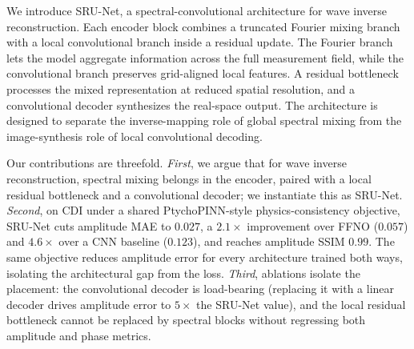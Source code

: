 \documentclass[11pt]{article}
\begin{document}
We introduce SRU-Net, a spectral-convolutional architecture for wave inverse
reconstruction. Each encoder block combines a truncated Fourier mixing branch
with a local convolutional branch inside a residual update. The Fourier branch
lets the model aggregate information across the full measurement field, while
the convolutional branch preserves grid-aligned local features. A residual
bottleneck processes the mixed representation at reduced spatial resolution, and
a convolutional decoder synthesizes the real-space output. The architecture is
designed to separate the inverse-mapping role of global spectral mixing from the
image-synthesis role of local convolutional decoding.

Our contributions are threefold. \emph{First}, we argue that for wave inverse
reconstruction, spectral mixing belongs in the encoder, paired with a local
residual bottleneck and a convolutional decoder; we instantiate this as
SRU-Net. \emph{Second}, on CDI under a shared PtychoPINN-style
physics-consistency objective, SRU-Net cuts amplitude MAE to $0.027$, a
$2.1\times$ improvement over FFNO ($0.057$) and $4.6\times$ over a
CNN baseline ($0.123$), and reaches amplitude SSIM $0.99$. The same objective
reduces amplitude error for every architecture trained both ways, isolating
the architectural gap from the loss. \emph{Third}, ablations isolate the
placement: the convolutional decoder is load-bearing (replacing it with a
linear decoder drives amplitude error to $5\times$ the SRU-Net value), and
the local residual bottleneck cannot be replaced by spectral blocks without
regressing both amplitude and phase metrics.


%
\end{document}
